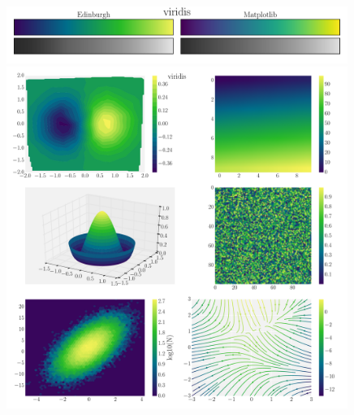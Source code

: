\documentclass[10pt,a4paper]{article}
\begin{document}
\newpage
\begin{figure}[ht]
  \centering
  \includegraphics[width=0.99\textwidth]{viridisBars.pdf}
  \includegraphics[width=0.99\textwidth]{viridisExamples.pdf}
\end{figure}
\end{document}
